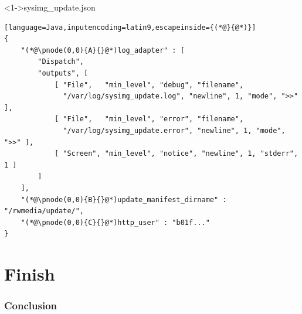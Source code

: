 \documentclass[ngerman,xcolor={table,dvipsnames},smaller,compress,hyperref={bookmarks,colorlinks},handout]{beamer}%
\begin{document}
\begin{frame}[t,fragile]

\begin{block}<1->{sysimg\_update.json}
\scriptsize
\begin{lstlisting}[language=Java,inputencoding=latin9,escapeinside={(*@}{@*)}]
{
    "(*@\pnode(0,0){A}{}@*)log_adapter" : [
        "Dispatch",
        "outputs", [
            [ "File",   "min_level", "debug", "filename",
              "/var/log/sysimg_update.log", "newline", 1, "mode", ">>" ],
            [ "File",   "min_level", "error", "filename",
              "/var/log/sysimg_update.error", "newline", 1, "mode", ">>" ],
            [ "Screen", "min_level", "notice", "newline", 1, "stderr", 1 ]
        ]
    ],
    "(*@\pnode(0,0){B}{}@*)update_manifest_dirname" : "/rwmedia/update/",
    "(*@\pnode(0,0){C}{}@*)http_user" : "b01f..."
}
\end{lstlisting}
\end{block}

\begin{itemize}
\end{itemize}


\end{frame}
\part{Finish}

\section{Conclusion}
\end{document}
